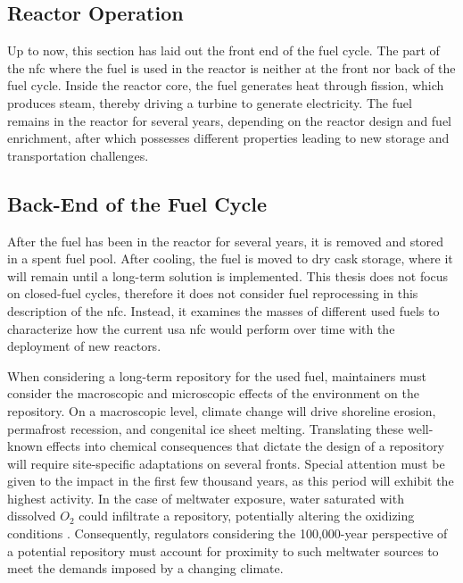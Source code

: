 \subsection{Reactor Operation}
\label{sec:reactor_operation}
Up to now, this section has laid out the front end of the fuel cycle. The part of the \gls{nfc} where the fuel is used in the reactor is neither at the front nor back of the fuel cycle. Inside the reactor core, the fuel generates heat through fission, which produces steam, thereby driving a turbine to generate electricity. The fuel remains in the reactor for several years, depending on the reactor design and fuel enrichment, after which possesses different properties leading to new storage and transportation challenges. %


\subsection{Back-End of the Fuel Cycle}
\label{sec:back_end}
After the fuel has been in the reactor for several years, it is removed and
stored in a spent fuel pool. After cooling, the fuel is moved to dry cask
storage, where it will remain until a long-term solution is implemented.
This thesis does not focus on closed-fuel cycles, therefore it does not consider fuel reprocessing in this description of the \gls{nfc}. Instead, it examines the masses of different used fuels to characterize how the current \gls{usa} \gls{nfc} would perform over time with the deployment of new reactors.

When considering a long-term repository for the used fuel, maintainers must consider the macroscopic and microscopic effects of the environment on the repository. On a macroscopic level, climate change will drive shoreline erosion, permafrost recession, and congenital ice sheet melting. Translating these well-known effects into chemical consequences that dictate the design of a repository will require site-specific adaptations on several fronts. Special attention must be given to the impact in the first few thousand years, as this period will exhibit the highest activity. In the case of meltwater exposure, water saturated with dissolved $O_2$ could infiltrate a repository, potentially altering the oxidizing conditions \cite{gurban_hydrochemical_2001}. Consequently, regulators considering the 100,000-year perspective of a potential repository must account for proximity to such meltwater sources to meet the demands imposed by a changing climate.

